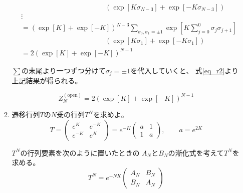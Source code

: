 \documentclass[12pt,b5paper]{ltjsarticle}
\begin{document}
\begin{enumerate}
\begin{enumerate}
\begin{align}
                & \qquad\qquad\qquad\qquad\qquad\qquad
                  \left(
                      \exp \left[K \sigma_{N-3} \right]
                        +\exp \left[-K \sigma_{N-3} \right]
                    \right)\\
             & \vdots \nonumber\\
              &= (\exp [K]+\exp [-K])^{N-3}
                \sum_{\sigma_{0},\sigma_{1} = \pm 1}
                \exp \left[
                    K \sum_{j=0}^{0}\sigma_{j}\sigma_{j+1}
                    \right]\nonumber\\
                & \qquad\qquad\qquad\qquad\qquad\qquad
                  \left(
                      \exp \left[K \sigma_{1} \right]
                        +\exp \left[-K \sigma_{1} \right]
                    \right)\\
             & = 2 (\exp [K]+\exp [-K])^{N-1}
            \end{align}

            $\sum$の末尾より一つずつ分けて$\sigma_{j}=\pm 1$を代入していくと、
            式\eqref{eq_r2}より上記結果が得られる。

            \begin{equation}
             Z^{(\mathrm{open})}_{N} = 2 (\exp [K]+\exp [-K])^{N-1}
              \label{eq_zn}
            \end{equation}

            \hrulefill


       \item
            遷移行列$T$の$N$乗の行列$T^{N}$を求めよ。
            \begin{equation}
             T=
              \begin{pmatrix}
               e^{K} & e^{-K} \\ e^{-K} & e^{K}
              \end{pmatrix}
              =
              e^{-K}
              \begin{pmatrix}
               a & 1 \\ 1 & a
              \end{pmatrix}
              ,\qquad
              a=e^{2K}
            \end{equation}

            $T^{N}$の行列要素を次のように置いたときの
            $A_{N}$と$B_{N}$の漸化式を考えて$T^{N}$を求める。
            \begin{equation}
             T^{N} =
              e^{-NK}
              \begin{pmatrix}
               A_{N} & B_{N} \\ B_{N} & A_{N}
              \end{pmatrix}
            \end{equation}


\end{enumerate}
\end{enumerate}
\end{document}
